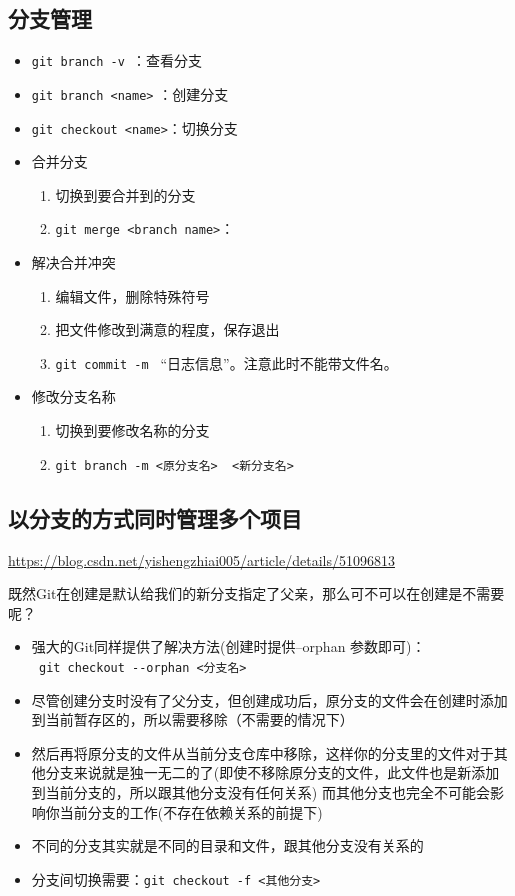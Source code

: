 \subsection{分支管理}
\begin{itemize}
\item \verb|git branch -v |：查看分支
\item \verb|git branch <name>| ：创建分支
\item \verb|git checkout <name>|：切换分支
\item 合并分支
\begin{enumerate}
\item 切换到要合并到的分支
\item \verb|git merge <branch name>|：
\end{enumerate}
\item 解决合并冲突
\begin{enumerate}
\item  编辑文件，删除特殊符号
\item 把文件修改到满意的程度，保存退出
\item \verb|git commit -m | ``日志信息''。注意此时不能带文件名。
\end{enumerate}

\item 修改分支名称
\begin{enumerate}
\item 切换到要修改名称的分支
\item \verb|git branch -m <原分支名>  <新分支名>|
\end{enumerate}
\end{itemize}



\subsection{以分支的方式同时管理多个项目}
\url{https://blog.csdn.net/yishengzhiai005/article/details/51096813}

既然Git在创建是默认给我们的新分支指定了父亲，那么可不可以在创建是不需要呢？

\begin{itemize}
\item 强大的Git同样提供了解决方法(创建时提供--orphan 参数即可)：\\
\verb| git checkout --orphan <分支名>|
\item 尽管创建分支时没有了父分支，但创建成功后，原分支的文件会在创建时添加到当前暂存区的，所以需要移除（不需要的情况下）
\item 然后再将原分支的文件从当前分支仓库中移除，这样你的分支里的文件对于其他分支来说就是独一无二的了(即使不移除原分支的文件，此文件也是新添加到当前分支的，所以跟其他分支没有任何关系)
而其他分支也完全不可能会影响你当前分支的工作(不存在依赖关系的前提下)
\item 不同的分支其实就是不同的目录和文件，跟其他分支没有关系的
\item 分支间切换需要：\verb|git checkout -f <其他分支>|
\end{itemize}

